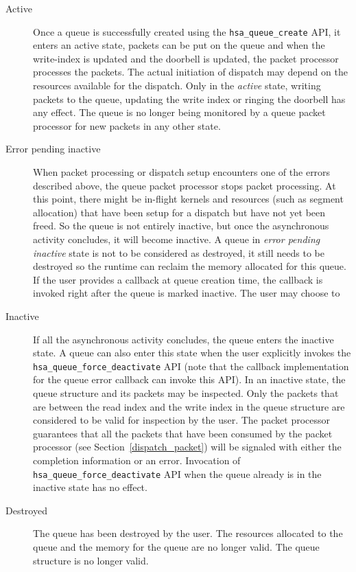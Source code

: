 \begin{description}
\item[Active] Once a queue is successfully created using the
\texttt{hsa\_queue\_create} API, it enters an active state, packets can
be put on the queue and when the write-index is updated and the
doorbell is updated, the packet processor processes the packets. The
actual initiation of dispatch may depend on the resources available
for the dispatch. 
Only in the \emph{active} state, writing packets to
the queue, updating the write index or ringing the doorbell has 
any effect. The queue is no longer being monitored by a queue packet
processor for new packets in any other state.

\item[Error pending inactive] When packet processing or
dispatch setup encounters one of the errors described above, the
queue packet processor stops packet processing. 
At this point, there might be in-flight kernels and resources (such
as segment allocation) that have been setup for a dispatch but have
not yet been freed. So the queue is not entirely inactive, but once
the asynchronous activity concludes, it will become inactive.  A
queue in \emph{error pending inactive} state is not to be considered
as destroyed, it still needs to be destroyed so the runtime can
reclaim the memory allocated for this queue. If the user provides a
callback at queue creation time, the callback is invoked right after
the queue is marked inactive. The user may choose to 

\item[Inactive] If all the asynchronous activity concludes, the
queue enters the inactive state. 
A queue can also enter this state when the user explicitly invokes
the \texttt{hsa\_queue\_force\_deactivate} API (note that the callback
implementation for the queue error callback can invoke this API).  
In an inactive state, the queue
structure and its packets may be inspected. Only the packets that
are between the read index and the write index
in the queue structure are considered to be valid for inspection by
the user. The packet processor guarantees that all the packets that
have been consumed by the packet processor (see
Section~\ref{dispatch_packet}) will be signaled with either the
completion information or an error. 
Invocation of \texttt{hsa\_queue\_force\_deactivate} API when the
queue already is in the inactive state has no effect.

\item[Destroyed] The queue has been destroyed by the user.  The
resources allocated to the queue and the memory for the queue are no
longer valid. The queue structure is no longer valid. 
\end{description}

